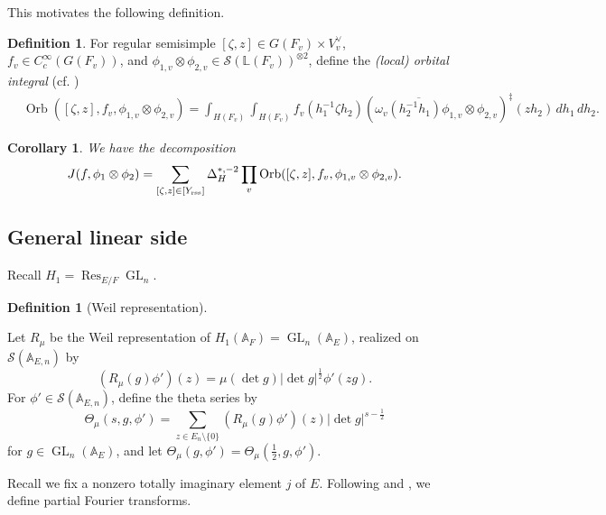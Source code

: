 \documentclass[11pt, reqno]{amsart}
\numberwithin{equation}{subsection}
\theoremstyle{plain}
\newtheorem{corollary}[proposition]{Corollary}
\theoremstyle{definition}
\newtheorem{definition}[proposition]{Definition}
\newcommand{\BA}{\mathbb A}
\renewcommand{\AA}{\mathbb A}
\newcommand{\LL}{\mathbb L}
\newcommand{\ol}{\overline}
\newcommand{\cS}{\mathcal S}
\DeclareMathOperator{\GL}{GL}
\DeclareMathOperator{\Orb}{Orb}
\DeclareMathOperator{\Res}{Res}
\newcommand{\rss}{\textnormal{rss}}
\begin{document}
This motivates the following definition.


\begin{definition} \label{defn: local orb: unitary side}
For regular semisimple $[\zeta, z] \in G(F_v) \times V_v^\vee$,
$f_v \in C_c^\infty(G(F_v))$, and
$\phi_{1,v} \otimes \phi_{2,v} \in \cS(\LL(F_v))^{\otimes 2}$, 
define the \emph{(local) orbital integral} (cf. \cite[(4.1.2) and (4.1.4)]{Xue-GGP})
\begin{align*}
    &\Orb([\zeta, z], f_v, \phi_{1,v} \otimes \phi_{2,v}) = \int_{H(F_v)}\int_{H(F_v)} f_v(h_1^{-1}\zeta h_2)
    ( \ol{\omega_v(h^{-1}_2h_1)\phi_{1,v}} \otimes \phi_{2,v})^\ddagger(zh_2)\, dh_1\, dh_2.
\end{align*}
\end{definition}


\begin{corollary}
We have the decomposition
\[
    J(f, \phi_1 \otimes \phi_2)
    = \sum_{[\zeta, z] \in [Y_\rss]}
    \Delta_H^{*,-2}
    \prod_v \Orb([\zeta, z], f_v, \phi_{1,v} \otimes \phi_{2,v}).
\]    
\end{corollary}


\subsection{General linear side}

Recall $H_1=\Res_{E/F}\GL_n$.  

\begin{definition}[Weil representation] \label{defn theta series: GL side}

Let $R_\mu$ be the Weil representation of $H_1(\BA_F)=\GL_n(\AA_E)$, realized on $\cS(\AA_{E,n})$ by
\begin{equation}
   (R_\mu(g)\phi')(z) = \mu(\det g) \lvert \det g \rvert^{\frac12}
    \phi'(zg). 
\end{equation}    
For $\phi' \in \cS(\AA_{E,n})$,
define the theta series by   
\begin{equation}
\Theta_\mu(s, g, \phi') = \sum_{z \in E_n \setminus \{0\}} (R_\mu(g) \phi')(z) \lvert \det g \rvert^{s-\frac 12}
\end{equation}
for $g \in \GL_n(\AA_E)$, and let 
$\Theta_\mu(g, \phi') = \Theta_\mu(\frac12, g, \phi')$.
\end{definition}

Recall we fix a nonzero totally imaginary element $j$ of $E$. Following \cite[Section 3.1]{Xue-GGP} 
and \cite[(7.3)]{GGP-FourierJacobi}, we define partial Fourier transforms.
\end{document}
